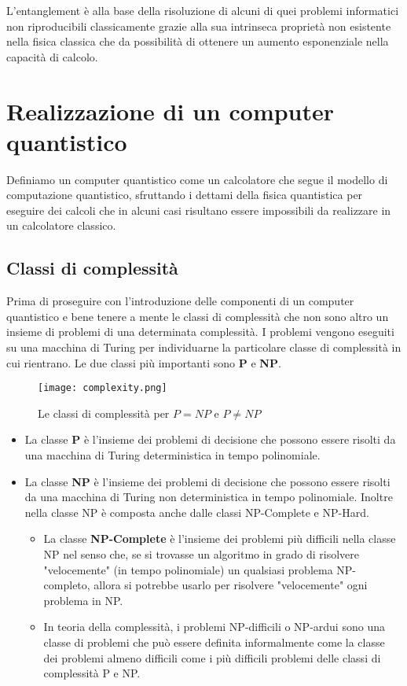 L'entanglement è alla base della risoluzione di alcuni di quei problemi informatici non riproducibili classicamente grazie alla sua intrinseca proprietà non esistente nella fisica classica che da possibilità di ottenere un aumento esponenziale nella capacità di calcolo.

\section{Realizzazione di un computer quantistico}
Definiamo un computer quantistico come un calcolatore che segue il modello di computazione quantistico, sfruttando i dettami della fisica quantistica per eseguire dei calcoli che in alcuni casi risultano essere impossibili da realizzare in un calcolatore classico.

\subsection{Classi di complessità}
Prima di proseguire con l'introduzione delle componenti di un computer quantistico e bene tenere a mente le classi di complessità che non sono altro un insieme di problemi di una determinata complessità.
I problemi vengono eseguiti su una macchina di Turing per individuarne la particolare classe di complessità in cui rientrano. Le due classi più importanti sono \textbf{P} e \textbf{NP}.

\begin{figure}[h]
  \centering
  \texttt{[image: complexity.png]}
  \caption{Le classi di complessità per \(P = NP\) e \(P \neq NP\)}
  \label{fig:complexity}
\end{figure}

\begin{itemize}
  \item La classe \textbf{P} è l'insieme dei problemi di decisione che possono essere risolti da una macchina di Turing deterministica in tempo polinomiale.
  \item La classe \textbf{NP} è l'insieme dei problemi di decisione che possono essere risolti da una macchina di Turing non deterministica in tempo polinomiale. Inoltre nella classe NP è composta anche dalle classi NP-Complete e NP-Hard.
  \begin{itemize}
    \item La classe \textbf{NP-Complete} è l'insieme dei problemi più difficili nella classe NP nel senso che, se si trovasse un algoritmo in grado di risolvere "velocemente" (in tempo polinomiale) un qualsiasi problema NP-completo, allora si potrebbe usarlo per risolvere "velocemente" ogni problema in NP.
    \item In teoria della complessità, i problemi NP-difficili o NP-ardui sono una classe di problemi che può essere definita informalmente come la classe dei problemi almeno difficili come i più difficili problemi delle classi di complessità P e NP.
  \end{itemize}
\end{itemize}

